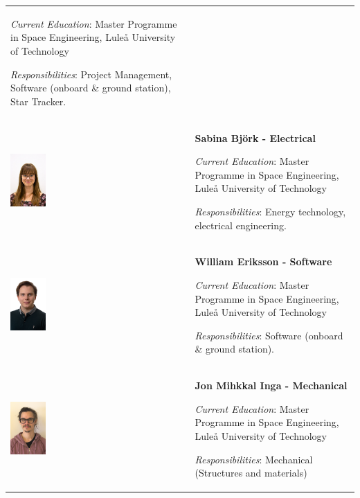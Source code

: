 \begin{longtable}[]{m{} m{}}
\smallskip
\textit{Current Education}: Master Programme in Space Engineering, Luleå University of Technology

\smallskip
\textit{Responsibilities}: Project Management, Software (onboard \& ground station), Star Tracker.
\bigskip
\\

\includegraphics[width=0.2\textwidth]{0-cover/img/TEAMPICS/Sabina_final.jpg}  & \textbf{Sabina Bj\"ork - Electrical}

\smallskip
\textit{Current Education}: Master Programme in Space Engineering, Luleå University of Technology

\smallskip
\textit{Responsibilities}: Energy technology, electrical engineering.
\bigskip
\\

\includegraphics[width=0.2\textwidth]{0-cover/img/TEAMPICS/William_final.jpg}  & \textbf{William Eriksson - Software}

\smallskip
\textit{Current Education}: Master Programme in Space Engineering, Luleå University of Technology

\smallskip
\textit{Responsibilities}: Software (onboard \& ground station).
\bigskip
\\

\includegraphics[width=0.2\textwidth]{0-cover/img/TEAMPICS/Jon_Final.jpg} & \textbf{Jon Mihkkal Inga - Mechanical}

\smallskip
\textit{Current Education}: Master Programme in Space Engineering, Luleå University of Technology

\smallskip
\textit{Responsibilities}: Mechanical (Structures and materials)

\label{tab:people}
\end{longtable}
\raggedbottom
